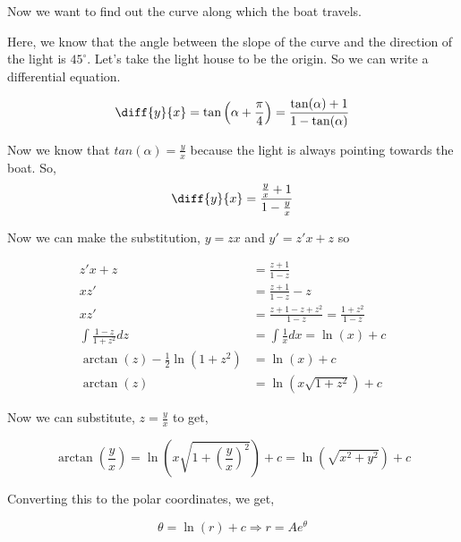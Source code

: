 Now we want to find out the curve along which the boat travels.

Here, we know that the angle between the slope of the curve and the direction of the light is $45^{\circ}$.
Let's take the light house to be the origin.
So we can write a differential equation.

$$ \diff{y}{x} = \tan \left( \alpha + \frac{\pi}{4} \right) = \frac{\tan(\alpha) + 1}{1 - \tan(\alpha)} $$

Now we know that $tan(\alpha) = \frac{y}{x}$ because the light is always pointing towards the boat.
So,
$$
\diff{y}{x} = \frac{\frac{y}{x} + 1}{1 - \frac{y}{x}}
$$

Now we can make the substitution, $y = zx$ and $y' = z'x + z$ so

\begin{align*}
z'x + z & = \frac{z+1}{1-z} \\
x z' & = \frac{z+1}{1-z} - z \\
x z' & = \frac{z+1-z+z^2}{1-z} = \frac{1+z^2}{1-z} \\
\int \frac{1-z}{1+z^2} dz & = \int \frac{1}{x} dx = \ln(x) + c \\
\arctan(z) - \frac{1}{2}\ln(1+z^2) & = \ln(x) + c \\
\arctan(z) & = \ln( x \sqrt{1+z^2} ) + c
\end{align*}

Now we can substitute, $z = \frac{y}{x}$ to get,

$$
\arctan \left( \frac{y}{x} \right)
= \ln \left( x \sqrt{ 1 + \left( \frac{y}{x} \right)^2 } \right) + c
= \ln(\sqrt{x^2 + y^2}) + c
$$

Converting this to the polar coordinates, we get,

$$ \theta = \ln(r) + c \Rightarrow r = Ae^{\theta} $$


